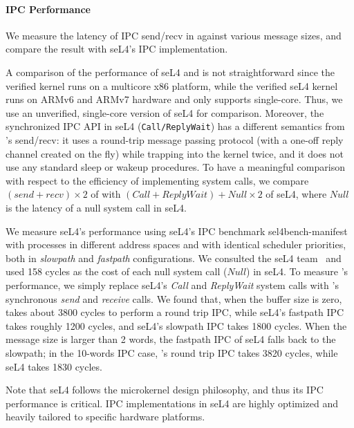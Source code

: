 \paragraph{IPC Performance} We measure the latency of IPC send/recv in {\cCTOS}
against various message sizes, and compare the result with seL4's IPC
implementation.

A comparison of the performance of seL4 and \cCTOS{} is not
straightforward since the verified \cCTOS{} kernel runs on a multicore
x86 platform, while the verified seL4 kernel runs on ARMv6 and ARMv7
hardware and only supports single-core. Thus, we use an unverified,
single-core version of seL4 for comparison. Moreover, the synchronized
IPC API in seL4 (\texttt{Call/ReplyWait}) has a different semantics
from \cCTOS{}'s send/recv: it uses a round-trip message passing
protocol (with a one-off reply channel created on the fly) while
trapping into the kernel twice, and it does not use any standard sleep
or wakeup procedures. To have a meaningful comparison with respect
to the efficiency of implementing system calls, we compare
$(send + recv) \times 2$
of \cCTOS{} with
${(Call + ReplyWait) + Null \times 2}$ of seL4,
where $Null$ is the latency of a null system call in seL4.

We measure seL4's performance using seL4's IPC benchmark
sel4bench-manifest~\cite{sel4bench} with processes in different
address spaces and with identical scheduler priorities, both in
\emph{slowpath} and \emph{fastpath} configurations. We consulted the
seL4 team~\cite{heiser16} and used 158 cycles as the cost of each null
system call ($Null$) in seL4. To measure \cCTOS{}'s performance, we
simply replace seL4's \emph{Call} and \emph{ReplyWait} system calls
with {\cCTOS}'s synchronous \emph{send} and \emph{receive} calls. We
found that, when the buffer size is zero, \cCTOS{} takes about 3800
cycles to perform a round trip IPC, while seL4's fastpath IPC takes
roughly 1200 cycles, and seL4's slowpath IPC takes 1800 cycles. When
the message size is larger than 2 words, the fastpath IPC of seL4
falls back to the slowpath; in the 10-words IPC case, \cCTOS{}'s round
trip IPC takes 3820 cycles, while seL4 takes 1830 cycles.
Note that seL4 follows the microkernel design philosophy, and thus its
IPC performance is critical. IPC implementations in seL4 are highly
optimized and heavily tailored to specific hardware platforms.

